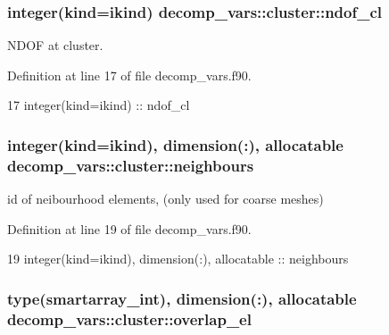 \subsubsection[{ndof\+\_\+cl}]{\setlength{\rightskip}{0pt plus 5cm}integer(kind=ikind) decomp\+\_\+vars\+::cluster\+::ndof\+\_\+cl\hspace{0.3cm}{\ttfamily [private]}}\label{structdecomp__vars_1_1cluster_a764a725d5ff9b9c6d39e02a408c1937e}


N\+D\+OF at cluster. 



Definition at line 17 of file decomp\+\_\+vars.\+f90.


\begin{DoxyCode}
17     \textcolor{keywordtype}{integer(kind=ikind)} :: ndof\_cl
\end{DoxyCode}
\subsubsection[{neighbours}]{\setlength{\rightskip}{0pt plus 5cm}integer(kind=ikind), dimension(\+:), allocatable decomp\+\_\+vars\+::cluster\+::neighbours\hspace{0.3cm}{\ttfamily [private]}}\label{structdecomp__vars_1_1cluster_afee19e9d9dde4f487dec611ce84d656a}


id of neibourhood elements, (only used for coarse meshes) 



Definition at line 19 of file decomp\+\_\+vars.\+f90.


\begin{DoxyCode}
19     \textcolor{keywordtype}{integer(kind=ikind)}, \textcolor{keywordtype}{dimension(:)}, \textcolor{keywordtype}{allocatable} :: neighbours
\end{DoxyCode}
\subsubsection[{overlap\+\_\+el}]{\setlength{\rightskip}{0pt plus 5cm}type({\bf smartarray\+\_\+int}), dimension(\+:), allocatable decomp\+\_\+vars\+::cluster\+::overlap\+\_\+el\hspace{0.3cm}{\ttfamily [private]}}\label{structdecomp__vars_1_1cluster_ae47f4d990e61f86570507d0be94211f7}


